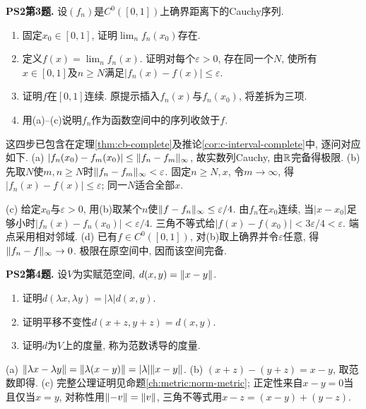\begin{exercise}\label{ps190:2:3}
\textbf{PS2第3题.} 设$(f_n)$是$C^0([0,1])$上确界距离下的Cauchy序列.
\begin{enumerate}[label=(\alph*)]
\item 固定$x_0\in[0,1]$, 证明$\lim_n f_n(x_0)$存在.
\item 定义$f(x)=\lim_n f_n(x)$. 证明对每个$\varepsilon>0$, 存在同一个$N$, 使所有$x\in[0,1]$及$n\ge N$满足$|f_n(x)-f(x)|\le\varepsilon$.
\item 证明$f$在$[0,1]$连续. 原提示插入$f_n(x)$与$f_n(x_0)$, 将差拆为三项.
\item 用(a)--(c)说明$f_n$作为函数空间中的序列收敛于$f$.
\end{enumerate}
\end{exercise}
\begin{solution}
这四步已包含在定理\ref{thm:cb-complete}及推论\ref{cor:c-interval-complete}中, 逐问对应如下. (a) $|f_n(x_0)-f_m(x_0)|\le\lVert f_n-f_m\rVert_\infty$, 故实数列Cauchy, 由$\mathbb R$完备得极限. (b) 先取$N$使$m,n\ge N$时$\lVert f_n-f_m\rVert_\infty<\varepsilon$. 固定$n\ge N,x$, 令$m\to\infty$, 得$|f_n(x)-f(x)|\le\varepsilon$; 同一$N$适合全部$x$.

(c) 给定$x_0$与$\varepsilon>0$, 用(b)取某个$n$使$\lVert f-f_n\rVert_\infty\le\varepsilon/4$. 由$f_n$在$x_0$连续, 当$|x-x_0|$足够小时$|f_n(x)-f_n(x_0)|<\varepsilon/4$. 三角不等式给$|f(x)-f(x_0)|<3\varepsilon/4<\varepsilon$. 端点采用相对邻域. (d) 已有$f\in C^0([0,1])$, 对(b)取上确界并令$\varepsilon$任意, 得$\lVert f_n-f\rVert_\infty\to0$. 极限在原空间中, 因而该空间完备.
\end{solution}

\begin{exercise}\label{ps190:2:4}
\textbf{PS2第4题.} 设$V$为实赋范空间, $d(x,y)=\lVert x-y\rVert$.
\begin{enumerate}[label=(\alph*)]
\item 证明$d(\lambda x,\lambda y)=|\lambda|d(x,y)$.
\item 证明平移不变性$d(x+z,y+z)=d(x,y)$.
\item 证明$d$为$V$上的度量, 称为范数诱导的度量.
\end{enumerate}
\end{exercise}
\begin{solution}
(a) $\lVert \lambda x-\lambda y\rVert=\lVert \lambda(x-y)\rVert=|\lambda|\lVert x-y\rVert$. (b) $(x+z)-(y+z)=x-y$, 取范数即得. (c) 完整公理证明见命题\ref{ch:metric:norm-metric}; 正定性来自$x-y=0$当且仅当$x=y$, 对称性用$\lVert -v\rVert=\lVert v\rVert$, 三角不等式用$x-z=(x-y)+(y-z)$.
\end{solution}

